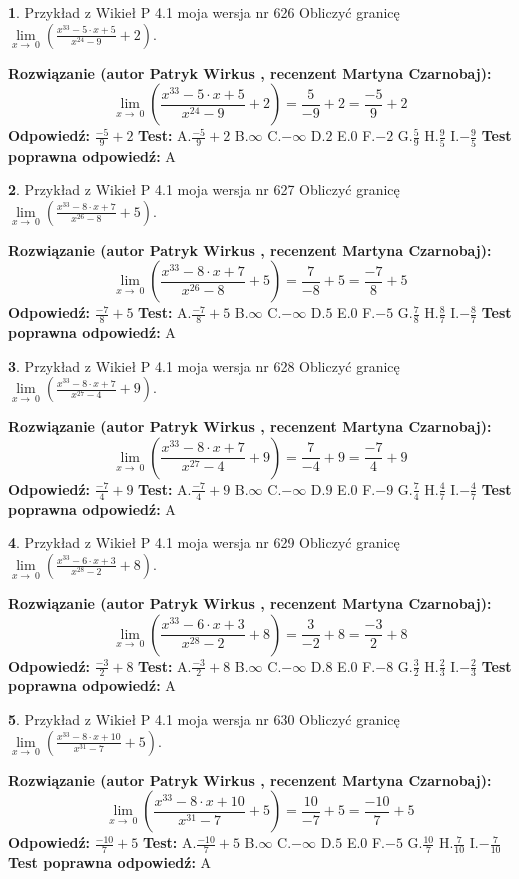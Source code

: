 \documentclass[12pt, a4paper]{article}
\theoremstyle{definition} %
\newtheorem{zad}{}
\newcommand{\zadStart}[1]{\begin{zad}#1\newline}
\newcommand{\zadStop}{\end{zad}}
\newcommand{\rozwStart}[2]{\noindent \textbf{Rozwiązanie (autor #1 , recenzent #2): }\newline}
\newcommand{\rozwStop}{\newline}
\newcommand{\odpStart}{\noindent \textbf{Odpowiedź:}\newline}
\newcommand{\odpStop}{\newline}
\newcommand{\testStart}{\noindent \textbf{Test:}\newline}
\newcommand{\testStop}{\newline}
\newcommand{\kluczStart}{\noindent \textbf{Test poprawna odpowiedź:}\newline}
\newcommand{\kluczStop}{\newline}
\begin{document}
\zadStart{Przykład z Wikieł P 4.1 moja wersja nr 626}
Obliczyć granicę $\lim\limits_{x\to\ 0}(\frac{x^{33}-5 \cdot x +5}{x^{24}-9}+2)$.
\zadStop
\rozwStart{Patryk Wirkus}{Martyna Czarnobaj}
$$\lim\limits_{x\to\ 0}(\frac{x^{33}-5 \cdot x +5}{x^{24}-9}+2)=\frac{5}{-9}+2=\frac{-5}{9}+2$$
\rozwStop
\odpStart
$\frac{-5}{9}+2$
\odpStop
\testStart
A.$\frac{-5}{9}+2$
B.$\infty$
C.$-\infty$
D.$2$
E.$0$
F.$-2$
G.$\frac{5}{9}$
H.$\frac{9}{5}$
I.$-\frac{9}{5}$
\testStop
\kluczStart
A
\kluczStop



\zadStart{Przykład z Wikieł P 4.1 moja wersja nr 627}
Obliczyć granicę $\lim\limits_{x\to\ 0}(\frac{x^{33}-8 \cdot x +7}{x^{26}-8}+5)$.
\zadStop
\rozwStart{Patryk Wirkus}{Martyna Czarnobaj}
$$\lim\limits_{x\to\ 0}(\frac{x^{33}-8 \cdot x +7}{x^{26}-8}+5)=\frac{7}{-8}+5=\frac{-7}{8}+5$$
\rozwStop
\odpStart
$\frac{-7}{8}+5$
\odpStop
\testStart
A.$\frac{-7}{8}+5$
B.$\infty$
C.$-\infty$
D.$5$
E.$0$
F.$-5$
G.$\frac{7}{8}$
H.$\frac{8}{7}$
I.$-\frac{8}{7}$
\testStop
\kluczStart
A
\kluczStop



\zadStart{Przykład z Wikieł P 4.1 moja wersja nr 628}
Obliczyć granicę $\lim\limits_{x\to\ 0}(\frac{x^{33}-8 \cdot x +7}{x^{27}-4}+9)$.
\zadStop
\rozwStart{Patryk Wirkus}{Martyna Czarnobaj}
$$\lim\limits_{x\to\ 0}(\frac{x^{33}-8 \cdot x +7}{x^{27}-4}+9)=\frac{7}{-4}+9=\frac{-7}{4}+9$$
\rozwStop
\odpStart
$\frac{-7}{4}+9$
\odpStop
\testStart
A.$\frac{-7}{4}+9$
B.$\infty$
C.$-\infty$
D.$9$
E.$0$
F.$-9$
G.$\frac{7}{4}$
H.$\frac{4}{7}$
I.$-\frac{4}{7}$
\testStop
\kluczStart
A
\kluczStop



\zadStart{Przykład z Wikieł P 4.1 moja wersja nr 629}
Obliczyć granicę $\lim\limits_{x\to\ 0}(\frac{x^{33}-6 \cdot x +3}{x^{28}-2}+8)$.
\zadStop
\rozwStart{Patryk Wirkus}{Martyna Czarnobaj}
$$\lim\limits_{x\to\ 0}(\frac{x^{33}-6 \cdot x +3}{x^{28}-2}+8)=\frac{3}{-2}+8=\frac{-3}{2}+8$$
\rozwStop
\odpStart
$\frac{-3}{2}+8$
\odpStop
\testStart
A.$\frac{-3}{2}+8$
B.$\infty$
C.$-\infty$
D.$8$
E.$0$
F.$-8$
G.$\frac{3}{2}$
H.$\frac{2}{3}$
I.$-\frac{2}{3}$
\testStop
\kluczStart
A
\kluczStop



\zadStart{Przykład z Wikieł P 4.1 moja wersja nr 630}
Obliczyć granicę $\lim\limits_{x\to\ 0}(\frac{x^{33}-8 \cdot x +10}{x^{31}-7}+5)$.
\zadStop
\rozwStart{Patryk Wirkus}{Martyna Czarnobaj}
$$\lim\limits_{x\to\ 0}(\frac{x^{33}-8 \cdot x +10}{x^{31}-7}+5)=\frac{10}{-7}+5=\frac{-10}{7}+5$$
\rozwStop
\odpStart
$\frac{-10}{7}+5$
\odpStop
\testStart
A.$\frac{-10}{7}+5$
B.$\infty$
C.$-\infty$
D.$5$
E.$0$
F.$-5$
G.$\frac{10}{7}$
H.$\frac{7}{10}$
I.$-\frac{7}{10}$
\testStop
\kluczStart
A
\kluczStop
\end{document}
